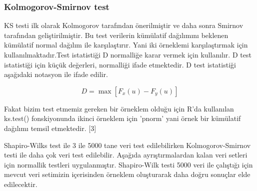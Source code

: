 \documentclass[11pt]{article}
\begin{document}
\subsubsection{Kolmogorov-Smirnov test}\label{kolmogorov-smirnov-test}

KS testi ilk olarak Kolmogorov tarafından önerilmiştir ve daha sonra
Smirnov tarafından geliştirilmiştir. Bu test verilerin kümülatif
dağılımını beklenen kümülatif normal dağılım ile karşılaştırır. Yani iki
örneklemi karşılaştırmak için kullanılmaktadır.Test istatistiği D
normalliğe karar vermek için kullanılır. D test istatistiği için küçük
değerleri, normalliği ifade etmektedir. D test istatistiği aşağıdaki
notasyon ile ifade edilir.

\[ D=\max[F_x(u)-F_y(u)]\]

Fakat bizim test etmemiz gereken bir örneklem olduğu için R'da
kullanılan ks.test() fonskiyonunda ikinci örneklem için 'pnorm' yani
örnek bir kümülatif dağılımı temsil etmektedir. {[}3{]}

Shapiro-Wilks test ile 3 ile 5000 tane veri test edilebilirken
Kolmogorov-Smirnov testi ile daha çok veri test edilebilir. Aşağıda
ayrıştırmalardan kalan veri setleri için normallik testleri
uygulanmıştır. Shapiro-Wilk testi 5000 veri ile çalıştığı için mevcut
veri setimizin içerisinden örneklem oluşturarak daha doğru sonuçlar elde
edilecektir.
\end{document}
